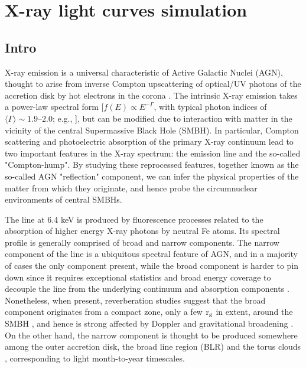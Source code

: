 \chapter{X-ray light curves simulation}



\section{Intro}
X-ray emission is a universal characteristic of Active Galactic Nuclei (AGN), thought to arise from inverse Compton upscattering of optical/UV photons of the accretion disk by hot electrons in the corona  \citep[e.g.,][]{1991ApJ...380L..51H}. The intrinsic X-ray emission takes a power-law spectral form  [$f(E){\propto}E^{-\Gamma}$, with  typical photon indices of ${\langle}\Gamma{\rangle}{\sim}1.9$--$2.0$; e.g., \citealt{1994MNRAS.268..405N, 2009ApJ...690.1322W, 2011A&A...530A..42C}], but can be modified due to interaction with matter in the vicinity of the central Supermassive Black Hole (SMBH). In particular, Compton scattering and photoelectric absorption of the primary X-ray continuum lead to two important features in the X-ray spectrum: the \kalfa{} emission line and the so-called "Compton-hump". By studying these reprocessed features, together known as the so-called AGN "reflection" component, we can infer the physical properties of the matter from which they originate, and hence probe the circumnuclear environments of central SMBHs. 

The \kalfa{} line at 6.4 keV is produced by fluorescence processes related to the absorption of higher energy X-ray photons by neutral Fe atoms. Its spectral profile is generally comprised of broad and narrow components. The narrow component of the \kalfa{} line \citep[
$\rm FWHM {\lesssim} 10,000\:km\:s^{-1}$; e.g.,][]{2001MNRAS.323L..37L,2004ApJ...604...63Y,2010ApJS..187..581S} is a ubiquitous spectral feature of AGN, and in a majority of cases the only component present, while the broad component is harder to pin down since it requires exceptional statistics and broad energy coverage to decouple the line from the underlying continuum and absorption components \citep[e.g.,][]{2006AN....327.1032G, 2014ApJ...787...83M}.
Nonetheless, when present, reverberation studies suggest that the broad component originates from a compact zone, only a few $\rm r_g$ in extent, around the SMBH \citep[e.g.,][]{2014MNRAS.438.2980C}, and hence is strong affected by Doppler and gravitational broadening \citep[e.g.,][]{1995MNRAS.272L...9M,1995Natur.375..659T,1995ApJ...453L..81Y}. On the other hand, the narrow component is thought to be produced somewhere among the outer accretion disk, the broad line region (BLR) and the torus clouds \citep[e.g.,][]{1994MNRAS.267..743G,1994ApJ...420L..57K,1995ApJ...453L..81Y}, corresponding to light month-to-year timescales. 

